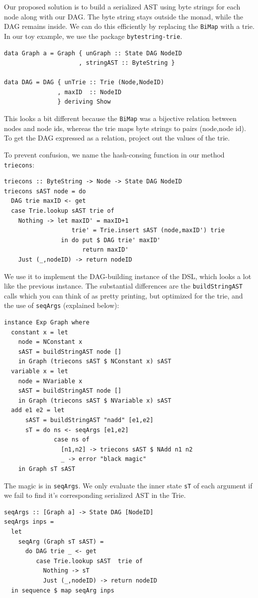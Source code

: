 \documentclass[runningheads]{llncs}
\begin{document}
Our proposed solution is to build a serialized AST using byte strings for each node along with our
DAG.
The byte string stays outside the monad, while the DAG remains inside.
We can do this efficiently by replacing the \texttt{BiMap}
with a trie.
In our toy example, we use the package \texttt{bytestring-trie}.

\begin{verbatim}
data Graph a = Graph { unGraph :: State DAG NodeID
                     , stringAST :: ByteString }

data DAG = DAG { unTrie :: Trie (Node,NodeID)
               , maxID  :: NodeID
               } deriving Show
\end{verbatim}
This looks a bit different because the \texttt{BiMap}
was a bijective relation between nodes and node ids,
whereas the trie maps byte strings to pairs (node,node id).
To get the DAG expressed as a relation, project out the values of the trie.

To prevent confusion, we name the hash-consing function in our method \texttt{triecons}:
\begin{verbatim}
triecons :: ByteString -> Node -> State DAG NodeID
triecons sAST node = do
  DAG trie maxID <- get
  case Trie.lookup sAST trie of
    Nothing -> let maxID' = maxID+1
                   trie' = Trie.insert sAST (node,maxID') trie
                in do put $ DAG trie' maxID'
                      return maxID'
    Just (_,nodeID) -> return nodeID
\end{verbatim}
We use it to implement the DAG-building instance of the DSL,
which looks a lot like the previous instance.
The substantial differences are the 
\texttt{buildStringAST} calls
which you can think of as pretty printing, but optimized for the trie,
and the use of \texttt{seqArgs} (explained below):
\begin{verbatim}
instance Exp Graph where
  constant x = let
    node = NConstant x
    sAST = buildStringAST node []
    in Graph (triecons sAST $ NConstant x) sAST
  variable x = let
    node = NVariable x
    sAST = buildStringAST node []
    in Graph (triecons sAST $ NVariable x) sAST
  add e1 e2 = let
      sAST = buildStringAST "nadd" [e1,e2]
      sT = do ns <- seqArgs [e1,e2]
              case ns of
                [n1,n2] -> triecons sAST $ NAdd n1 n2
                _ -> error "black magic"
    in Graph sT sAST
\end{verbatim}
The magic is in \texttt{seqArgs}.
We only evaluate the inner state \texttt{sT} of each argument if we
fail to find it's corresponding serialized AST in the Trie.
\begin{verbatim}
seqArgs :: [Graph a] -> State DAG [NodeID]
seqArgs inps =
  let
    seqArg (Graph sT sAST) =
      do DAG trie _ <- get
         case Trie.lookup sAST  trie of
           Nothing -> sT
           Just (_,nodeID) -> return nodeID
  in sequence $ map seqArg inps
\end{verbatim}
\end{document}

